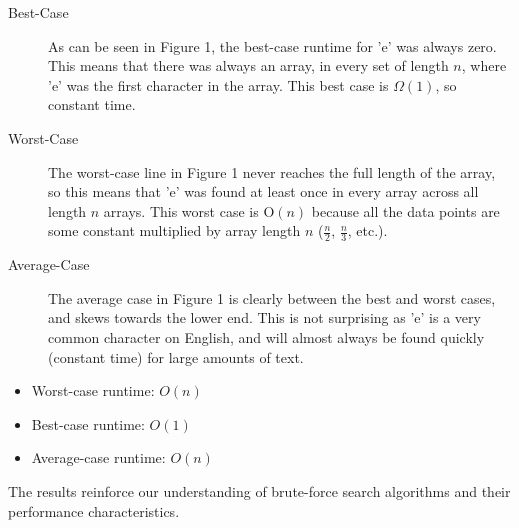 \documentclass{article}
\begin{document}
\begin{description}
    \item[Best-Case] As can be seen in Figure 1, the best-case runtime for 'e' was always zero. This means that there was always an array, in every set of length $n$, where 'e' was the first character in the array. This best case is $\Omega(1)$, so constant time.
    \item[Worst-Case] The worst-case line in Figure 1 never reaches the full length of the array, so this means that 'e' was found at least once in every array across all length $n$ arrays. This worst case is O$(n)$ because all the data points are some constant multiplied by array length $n$ ($\frac{n}{2}$, $\frac{n}{3}$, etc.).
    \item[Average-Case] The average case in Figure 1 is clearly between the best and worst cases, and skews towards the lower end. This is not surprising as 'e' is a very common character on English, and will almost always be found quickly (constant time) for large amounts of text. 
\end{description}


	
    \begin{itemize}
        \item Worst-case runtime: \( O(n) \)
	\item Best-case runtime: \( O(1) \)
	\item Average-case runtime: \( O(n) \)
    \end{itemize}
The results reinforce our understanding of brute-force search algorithms and their performance characteristics.
\end{document}
